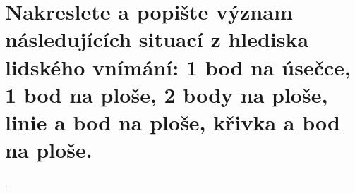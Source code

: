 \section{Nakreslete a popište význam následujících situací z hlediska lidského vnímání: 1 bod na úsečce, 1 bod na ploše, 
2 body na ploše, linie a bod na ploše, křivka a bod na ploše.}.